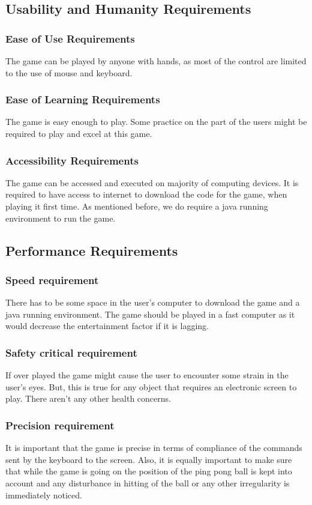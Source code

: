 \documentclass[12pt,letterpaper]{article}
\begin{document}
	\subsection{Usability and Humanity Requirements}
	\subsubsection{Ease of Use Requirements}
   	The game can be played by anyone with hands, as most of the control are limited to the use of mouse and keyboard.
 	\subsubsection{Ease of Learning Requirements}
   	The game is easy enough to play. Some practice on the part of the users might be required to play and excel at this game.
 	\subsubsection{Accessibility Requirements}
	The game can be accessed and executed on majority of computing devices. It is required to have access to internet to download the code for the game, when playing it first time. As mentioned before, we do require a java running environment to run the game.

\subsection{Performance Requirements}
\subsubsection{Speed requirement}
   	There has to be some space in the user’s computer to download the game and a java running environment. The game should be played in a fast computer as it would decrease the entertainment factor if it is lagging.
\subsubsection{Safety critical requirement}
   	If over played the game might cause the user to encounter some strain in the user’s eyes. But, this is true for any object that requires an electronic screen to play. There aren’t any other health concerns.
\subsubsection{Precision requirement}
   	It is important that the game is precise in terms of compliance of the commands sent by the keyboard to the screen. Also, it is equally important to make sure that while the game is going on the position of the ping pong ball is kept into account and any disturbance in hitting of the ball or any other irregularity is immediately noticed.
\end{document}
